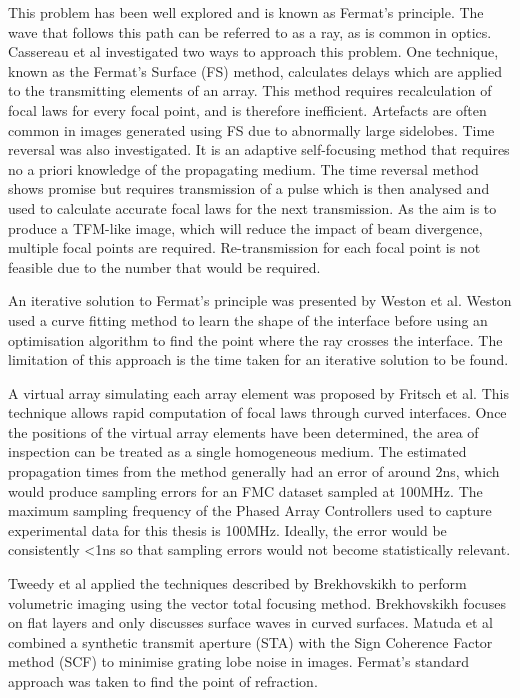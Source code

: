 This problem has been well explored and is known as Fermat's principle. The wave that follows this path can be referred to as a ray, as is common in optics\cite{schuster_introduction_1904}. Cassereau et al investigated two ways to approach this problem. One technique, known as the Fermat's Surface (FS) method, calculates delays which are applied to the transmitting elements of an array\cite{cassereau_theoretical_1994}. This method requires recalculation of focal laws for every focal point, and is therefore inefficient. Artefacts are often common in images generated using FS due to abnormally large sidelobes\cite{jones_acoustical_2012}. Time reversal was also investigated. It is an adaptive self-focusing method that requires no a priori knowledge of the propagating medium\cite{cunningham_ultrasonic_2012}.  The time reversal method shows promise but requires transmission of a pulse which is then analysed and used to calculate accurate focal laws for the next transmission. As the aim is to produce a TFM-like image, which will reduce the impact of beam divergence\cite{kitze_saft-reconstruction_2012}, multiple focal points are required. Re-transmission for each focal point is not feasible due to the number that would be required.

An iterative solution to Fermat's principle was presented by Weston et al\cite{weston_time_2012}.  Weston used a curve fitting method to learn the shape of the interface before using an optimisation algorithm to find the point where the ray crosses the interface. The limitation of this approach is the time taken for an iterative solution to be found. 

A virtual array simulating each array element was proposed by Fritsch et al\cite{fritsch_new_2012}. This technique allows rapid computation of focal laws through curved interfaces. Once the positions of the virtual array elements have been determined, the area of inspection can be treated as a single homogeneous medium. The estimated propagation times from the method generally had an error of around 2ns, which would produce sampling errors for an FMC dataset sampled at 100MHz. The maximum sampling frequency of the Phased Array Controllers used to capture experimental data for this thesis is 100MHz. Ideally, the error would be consistently \textless 1ns so that sampling errors would not become statistically relevant.

Tweedy et al applied the techniques described by Brekhovskikh\cite{brekhovskikh_waves_1980} to perform volumetric imaging using the vector total focusing method\cite{zhang_defect_2010}\cite{tweedie_total_2007}. Brekhovskikh focuses on flat layers and only discusses surface waves in curved surfaces. Matuda et al combined a synthetic transmit aperture (STA) with the Sign Coherence Factor method (SCF) to minimise grating lobe noise in images\cite{camacho_phase_2009}. Fermat's standard approach was taken to find the point of refraction\cite{matuda_imaging_2012}.

